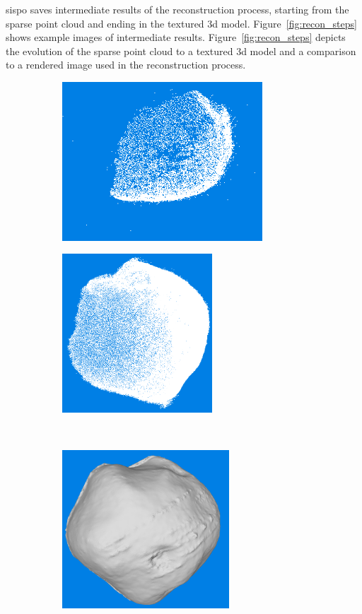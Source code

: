 \Gls{sispo} saves intermediate results of the reconstruction process, starting from the sparse point cloud and ending in the textured \gls{3d} model. Figure~\ref{fig:recon_steps} shows example images of intermediate results. Figure~\ref{fig:recon_steps} depicts the evolution of the sparse point cloud to a textured \gls{3d} model and a comparison to a rendered image used in the reconstruction process.

\begin{figure}[htbp]
    \centering
    \begin{subfigure}[b]{0.4\textwidth}
        \centering
        \includegraphics[width=\textwidth,height=5.95cm]{doc/thesis/0_figures/models_quality/100_1/120_100_1_points2.png}
        \caption{}
        \label{fig:recon_step_point}
    \end{subfigure}
    \begin{subfigure}[b]{0.4\textwidth}
        \centering
        \includegraphics[width=\textwidth,height=5.95cm]{doc/thesis/0_figures/models_quality/100_1/120_100_1_dense1.png}
        \caption{}
        \label{fig:recon_step_dense}
    \end{subfigure}
    \\
    \begin{subfigure}[b]{0.4\textwidth}
        \centering
        \includegraphics[width=\textwidth,height=5.95cm]{doc/thesis/0_figures/models_quality/100_1/120_100_1_mesh1.png}

\end{subfigure}
\end{figure}
